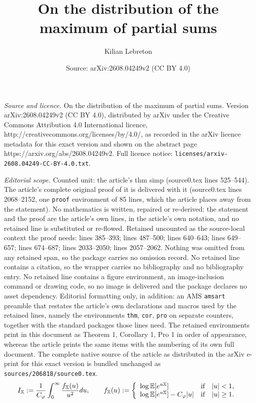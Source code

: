 \documentclass[10pt,a4paper]{amsart}
\title{On the distribution of the maximum of partial sums}
\author{Kilian Lebreton}
\date{Source: arXiv:2608.04249v2 (CC BY 4.0)}
\def\E{\mathbb{E}}
\def\Mp{C_\varphi}
\def\X{\mathbb{X}}
\begin{document}
\maketitle

\noindent\emph{Source and licence.} On the distribution of the maximum of partial sums. Version arXiv:2608.04249v2 (CC BY 4.0), distributed by arXiv under the Creative Commons Attribution 4.0 International licence, http://creativecommons.org/licenses/by/4.0/, as recorded in the arXiv licence metadata for this exact version and shown on the abstract page https://arxiv.org/abs/2608.04249v2. Full licence notice: \texttt{licenses/arxiv-2608.04249-CC-BY-4.0.txt}.\par\smallskip

\noindent\textit{Editorial scope.} Counted unit: the article's thm simp (source0.tex lines 525--544). The article's complete original proof of it is delivered with it (source0.tex lines 2068--2152, one \texttt{proof} environment of 85 lines, which the article places away from the statement). No mathematics is written, repaired or re-derived: the statement and the proof are the article's own lines, in the article's own notation, and no retained line is substituted or re-flowed.  Retained uncounted as the source-local context the proof needs: lines 385--393; lines 487--500; lines 640--643; lines 649--657; lines 674--687; lines 2033--2050; lines 2057--2062.  Nothing was omitted from any retained span, so the package carries no omission record.  No retained line contains a citation, so the wrapper carries no bibliography and no bibliography entry.  No retained line contains a figure environment, an image-inclusion command or drawing code, so no image is delivered and the package declares no asset dependency.  Editorial formatting only, in addition: an AMS \texttt{amsart} preamble that restates the article's own declarations and macros used by the retained lines, namely the environments \texttt{thm}, \texttt{cor}, \texttt{pro} on separate counters, together with the standard packages those lines need.  The retained environments print in this document as Theorem 1, Corollary 1, Pro 1 in order of appearance, whereas the article prints the same items with the numbering of its own full document.  The complete native source of the article as distributed in the arXiv e-print for this exact version is bundled unchanged as \texttt{sources/206818/source0.tex}.
\begin{equation}\label{def f_X}
I_\X :=\frac{1}{\Mp}\int_0^\infty \frac{f_{\X}(u)}{u^2}du, \qquad
f_\X(u) :=\left\{
\begin{array}{l cc l}
         \log \E[e^{u\X}] & \text{if}  & |u|<1,\\
     \log \E[e^{u\X}]- \Mp|u| & \text{if}  & |u|\geq 1. 
\end{array}
\right.
\end{equation}
\end{document}
